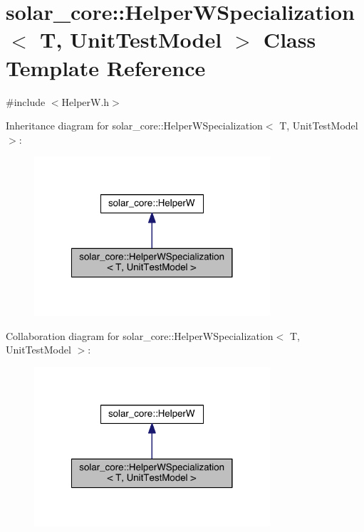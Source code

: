 \hypertarget{classsolar__core_1_1_helper_w_specialization_3_01_t_00_01_unit_test_model_01_4}{}\section{solar\+\_\+core\+:\+:Helper\+W\+Specialization$<$ T, Unit\+Test\+Model $>$ Class Template Reference}
\label{classsolar__core_1_1_helper_w_specialization_3_01_t_00_01_unit_test_model_01_4}


{\ttfamily \#include $<$Helper\+W.\+h$>$}



Inheritance diagram for solar\+\_\+core\+:\+:Helper\+W\+Specialization$<$ T, Unit\+Test\+Model $>$\+:\nopagebreak
\begin{figure}[H]
\begin{center}
\leavevmode
\includegraphics[width=248pt]{classsolar__core_1_1_helper_w_specialization_3_01_t_00_01_unit_test_model_01_4__inherit__graph}
\end{center}
\end{figure}


Collaboration diagram for solar\+\_\+core\+:\+:Helper\+W\+Specialization$<$ T, Unit\+Test\+Model $>$\+:\nopagebreak
\begin{figure}[H]
\begin{center}
\leavevmode
\includegraphics[width=248pt]{classsolar__core_1_1_helper_w_specialization_3_01_t_00_01_unit_test_model_01_4__coll__graph}
\end{center}
\end{figure}
